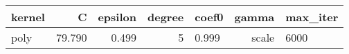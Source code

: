 \begin{tabular}{lrrrlr}
\toprule
kernel & C & epsilon & degree &coef0 & gamma & max_iter \\
\midrule
poly & 79.790 & 0.499 & 5 & 0.999 & scale & 6000 \\
\bottomrule
\end{tabular}

